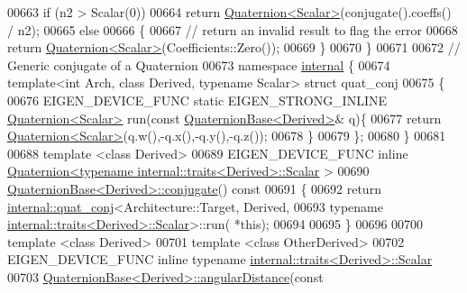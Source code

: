 \begin{DoxyCode}
{00663   \textcolor{keywordflow}{if} (n2 > Scalar(0))
00664     \textcolor{keywordflow}{return} \hyperlink{group___geometry___module_class_eigen_1_1_quaternion}{Quaternion<Scalar>}(conjugate().coeffs() / n2);
00665   \textcolor{keywordflow}{else}
00666   \{
00667     \textcolor{comment}{// return an invalid result to flag the error}
00668     \textcolor{keywordflow}{return} \hyperlink{group___geometry___module_class_eigen_1_1_quaternion}{Quaternion<Scalar>}(Coefficients::Zero());
00669   \}
00670 \}
00671 
00672 \textcolor{comment}{// Generic conjugate of a Quaternion}
00673 \textcolor{keyword}{namespace }\hyperlink{namespaceinternal}{internal} \{
00674 \textcolor{keyword}{template}<\textcolor{keywordtype}{int} Arch, \textcolor{keyword}{class} Derived, \textcolor{keyword}{typename} Scalar> \textcolor{keyword}{struct }quat\_conj
00675 \{
00676   EIGEN\_DEVICE\_FUNC \textcolor{keyword}{static} EIGEN\_STRONG\_INLINE \hyperlink{group___geometry___module_class_eigen_1_1_quaternion}{Quaternion<Scalar>} run(\textcolor{keyword}{const} 
      \hyperlink{group___geometry___module_class_eigen_1_1_quaternion_base}{QuaternionBase<Derived>}& q)\{
00677     \textcolor{keywordflow}{return} \hyperlink{group___geometry___module_class_eigen_1_1_quaternion}{Quaternion<Scalar>}(q.w(),-q.x(),-q.y(),-q.z());
00678   \}
00679 \};
00680 \}
00681                          
00688 \textcolor{keyword}{template} <\textcolor{keyword}{class} Derived>
00689 EIGEN\_DEVICE\_FUNC \textcolor{keyword}{inline} \hyperlink{group___geometry___module_class_eigen_1_1_quaternion}{Quaternion<typename internal::traits<Derived>::Scalar}
      >
00690 \hyperlink{group___geometry___module_aa82dabadce488031c298a5a0a92cda14}{QuaternionBase<Derived>::conjugate}()\textcolor{keyword}{ const}
00691 \textcolor{keyword}{}\{
00692   \textcolor{keywordflow}{return} \hyperlink{struct_eigen_1_1internal_1_1quat__conj}{internal::quat\_conj}<Architecture::Target, Derived,
00693                          \textcolor{keyword}{typename} \hyperlink{struct_eigen_1_1internal_1_1traits}{internal::traits<Derived>::Scalar}>::run(
      *\textcolor{keyword}{this});
00694                          
00695 \}
00696 
00700 \textcolor{keyword}{template} <\textcolor{keyword}{class} Derived>
00701 \textcolor{keyword}{template} <\textcolor{keyword}{class} OtherDerived>
00702 EIGEN\_DEVICE\_FUNC \textcolor{keyword}{inline} \textcolor{keyword}{typename} \hyperlink{struct_eigen_1_1internal_1_1traits}{internal::traits<Derived>::Scalar}
00703 \hyperlink{group___geometry___module_class_eigen_1_1_quaternion_base}{QuaternionBase<Derived>::angularDistance}(\textcolor{keyword}{const} 
}
\end{DoxyCode}
